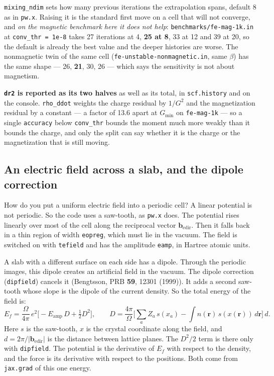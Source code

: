 \documentclass[11pt,a4paper]{article}
\newcommand{\code}[1]{\texttt{\small #1}}
\begin{document}
\code{mixing\_ndim} sets how many previous iterations the extrapolation spans,
default 8 as in \code{pw.x}. Raising it is the standard first move on a cell
that will not converge, and \emph{on the magnetic benchmark here it does not
help}: \code{benchmarks/fe-mag-1k.in} at \code{conv\_thr = 1e-8} takes 27
iterations at 4, \textbf{25 at 8}, 33 at 12 and 39 at 20, so the default is
already the best value and the deeper histories are worse. The nonmagnetic twin
of the same cell (\code{fe-unstable-nonmagnetic.in}, same $\beta$) has the same
shape --- 26, \textbf{21}, 30, 26 --- which says the sensitivity is not about
magnetism.

\textbf{\code{dr2} is reported as its two halves} as well as its total, in
\code{scf.history} and on the console. \code{rho\_ddot} weights the charge
residual by $1/G^2$ and the magnetization residual by a constant --- a factor of
13.6 apart at $G_{\min}$ on \code{fe-mag-1k} --- so a single \code{accuracy}
below \code{conv\_thr} bounds the moment much more weakly than it bounds the
charge, and only the split can say whether it is the charge or the magnetization
that is still moving.

\subsection{An electric field across a slab, and the dipole correction}

How do you put a uniform electric field into a periodic cell? A linear potential
is not periodic. So the code uses a saw-tooth, as \code{pw.x} does. The
potential rises linearly over most of the cell along the reciprocal vector
$\mathbf b_{\mathrm{edir}}$. Then it falls back in a thin region of width
\code{eopreg}, which must lie in the vacuum. The field is switched on with
\code{tefield} and has the amplitude \code{eamp}, in Hartree atomic units.

A slab with a different surface on each side has a dipole. Through the periodic
images, this dipole creates an artificial field in the vacuum. The dipole
correction (\code{dipfield}) cancels it (Bengtsson, PRB \textbf{59}, 12301
(1999)). It adds a second saw-tooth whose slope is the dipole of the current
density. So the total energy of the field is:
\begin{equation*}
E_f = \frac{\Omega}{4\pi}\,e^2\Big[-E_{\mathrm{amp}}\,D + \tfrac12 D^2\Big],
\qquad
D = \frac{4\pi}{\Omega}\Big[\sum_a Z_a\,s(x_a) - \int n(\mathbf r)\,s(x(\mathbf r))\,d\mathbf r\Big]\,d .
\end{equation*}
Here $s$ is the saw-tooth, $x$ is the crystal coordinate along the field, and
$d = 2\pi/|\mathbf b_{\mathrm{edir}}|$ is the distance between lattice planes.
The $D^2/2$ term is there only with \code{dipfield}. The potential is the
derivative of $E_f$ with respect to the density, and the force is its
derivative with respect to the positions. Both come from \code{jax.grad} of
this one energy.
\end{document}
